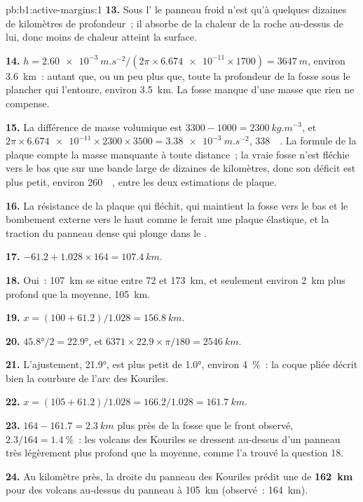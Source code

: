 \begin{solution}{pb:b1:active-margins:1}
\textbf{13.} Sous l' le panneau froid n'est qu'à quelques dizaines de kilomètres
de profondeur~; il absorbe de la chaleur de la roche au-dessus de lui, donc moins de chaleur atteint la
surface.

\textbf{14.} $h = \qty{2.60e-3}{m.s^{-2}}/(2\pi\times\num{6.674e-11}\times1700)
= \qty{3647}{m}$, environ \qty{3.6}{km}~: autant que, ou un peu plus que, toute la
profondeur de la fosse sous le plancher qui l'entoure, environ \qty{3.5}{km}. La
fosse manque d'une masse que rien ne compense.

\textbf{15.} La différence de masse volumique est $3300 - 1000 = \qty{2300}{kg.m^{-3}}$,
et $2\pi\times\num{6.674e-11}\times2300\times3500 = \qty{3.38e-3}{m.s^{-2}}$,
\qty{338}{\milli\gal}. La formule de la plaque compte la masse manquante à toute
distance~; la vraie fosse n'est fléchie vers le bas que sur une bande large de dizaines de kilomètres,
donc son déficit est plus petit, environ \qty{260}{\milli\gal}, entre les deux
estimations de plaque.

\textbf{16.} La résistance de la plaque qui fléchit, qui maintient la fosse vers le bas et
le bombement externe vers le haut comme le ferait une plaque élastique, et la traction du panneau dense
qui plonge dans le .

\textbf{17.} $-61.2 + 1.028\times164 = \qty{107.4}{km}$.

\textbf{18.} Oui~: \qty{107}{km} se situe entre 72 et \qty{173}{km}, et seulement
environ \qty{2}{km} plus profond que la moyenne, \qty{105}{km}.

\textbf{19.} $x = (100 + 61.2)/1.028 = \qty{156.8}{km}$.

\textbf{20.} $\ang{45.8}/2 = \ang{22.9}$, et
$6371\times22.9\times\pi/180 = \qty{2546}{km}$.

\textbf{21.} L'ajustement, \ang{21.9}, est plus petit de \ang{1.0}, environ
\qty{4}{\percent}~: la coque pliée décrit bien la courbure de l'arc des Kouriles.

\textbf{22.} $x = (105 + 61.2)/1.028 = 166.2/1.028 = \qty{161.7}{km}$.

\textbf{23.} $164 - 161.7 = \qty{2.3}{km}$ plus près de la fosse que le front
observé, $2.3/164 = \qty{1.4}{\percent}$~: les volcans des Kouriles se dressent au-dessus d'un panneau
très légèrement plus profond que la moyenne, comme l'a trouvé la question 18.

\textbf{24.} Au kilomètre près, la droite du panneau des Kouriles prédit une
 de \textbf{\qty[text-series-to-math=true]{162}{km}} pour
des volcans au-dessus du panneau à \qty{105}{km} (observé~: \qty{164}{km}).
\end{solution}
